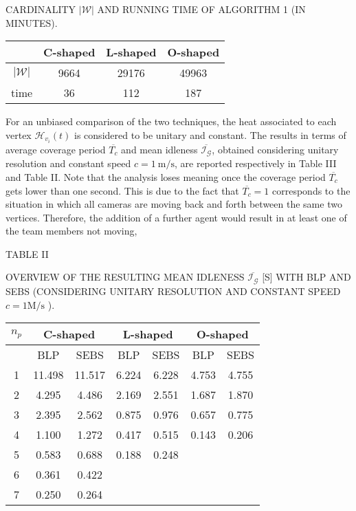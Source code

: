 \documentclass[conference]{IEEEtran}
\begin{document}
CARDINALITY $|\mathcal{W}|$ AND RUNNING TIME OF ALGORITHM 1 (IN MINUTES).

\begin{center}
\begin{tabular}{cccc}
\hline
 & C-shaped & L-shaped & O-shaped \\
\hline
$|\mathcal{W}|$ & 9664 & 29176 & 49963 \\
time & 36 & 112 & 187 \\
\end{tabular}
\end{center}

For an unbiased comparison of the two techniques, the heat associated to each vertex $\mathcal{H}_{v_{i}}(t)$ is considered to be unitary and constant. The results in terms of average coverage period $\overline{T_{c}}$ and mean idleness $\overline{\mathcal{I}_{\mathcal{G}}}$, obtained considering unitary resolution and constant speed $c=1 \mathrm{~m} / \mathrm{s}$, are reported respectively in Table III and Table II. Note that the analysis loses meaning once the coverage period $\overline{T_{c}}$ gets lower than one second. This is due to the fact that $\overline{T_{c}}=1$ corresponds to the situation in which all cameras are moving back and forth between the same two vertices. Therefore, the addition of a further agent would result in at least one of the team members not moving,

TABLE II

OVERVIEW OF THE RESULTING MEAN IDLENESS $\overline{\mathcal{I}_{\mathcal{G}}}$ [S] WITH BLP AND SEBS (CONSIDERING UNITARY RESOLUTION AND CONSTANT SPEED $c=1 \mathrm{M} / \mathrm{s}$ ).

\begin{center}
\begin{tabular}{|c|c|c|c|c|c|c|}
\hline
\multirow[b]{2}{*}{$n_{p}$} & \multicolumn{2}{|c|}{C-shaped} & \multicolumn{2}{|c|}{L-shaped} & \multicolumn{2}{|c|}{O-shaped} \\
\hline
 & BLP & SEBS & BLP & SEBS & BLP & SEBS \\
\hline
1 & 11.498 & 11.517 & 6.224 & 6.228 & 4.753 & 4.755 \\
\hline
2 & 4.295 & 4.486 & 2.169 & 2.551 & 1.687 & 1.870 \\
\hline
3 & 2.395 & 2.562 & 0.875 & 0.976 & 0.657 & 0.775 \\
\hline
4 & 1.100 & 1.272 & 0.417 & 0.515 & 0.143 & 0.206 \\
\hline
5 & 0.583 & 0.688 & 0.188 & 0.248 &  &  \\
\hline
6 & 0.361 & 0.422 &  &  &  &  \\
\hline
7 & 0.250 & 0.264 &  &  &  &  \\
\hline
\end{tabular}
\end{center}
\end{document}
